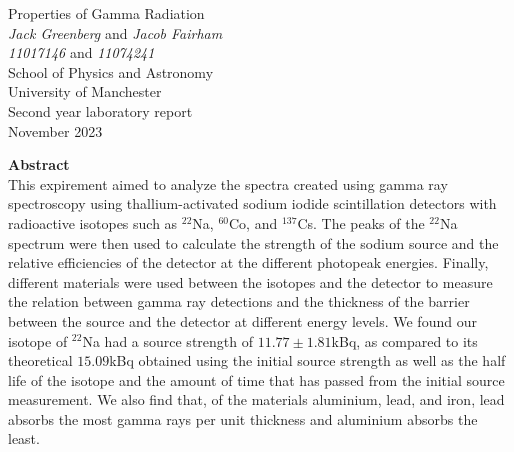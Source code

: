\documentclass[11pt]{article} %
\begin{document}


\begin{titlepage} %
\begin{center} %

{\Huge Properties of Gamma Radiation}\\[0.5cm] %
\textit{Jack Greenberg} and \textit{Jacob Fairham}~\\[0.3cm] %
\textit{11017146} and \textit{11074241}~\\[0.3cm]
School of Physics and Astronomy~\\[0.3cm]
University of Manchester~\\[0.3cm]
Second year laboratory report~\\[0.3cm]
November 2023~\\[2cm]


\end{center}
{\Large \textbf{Abstract}}~\\[0.3cm]
 This expirement aimed to analyze the spectra created using gamma ray spectroscopy using thallium-activated sodium iodide scintillation detectors with radioactive isotopes such as $^{22}$Na, $^{60}$Co, and $^{137}$Cs. The peaks of the $^{22}$Na spectrum were then used to calculate the strength of the sodium source and the relative efficiencies of the detector at the different photopeak energies. Finally, different materials were used between the isotopes and the detector to measure the relation between gamma ray detections and the thickness of the barrier between the source and the detector at different energy levels. We found our isotope of $^{22}$Na had a source strength of $11.77\pm1.81$kBq, as compared to its theoretical $15.09$kBq obtained using the initial source strength as well as the half life of the isotope and the amount of time that has passed from the initial source measurement. We also find that, of the materials aluminium, lead, and iron, lead absorbs the most gamma rays per unit thickness and aluminium absorbs the least.

\end{titlepage}
\clearpage
{} %
\setcounter{page}{2} %
\end{document}
